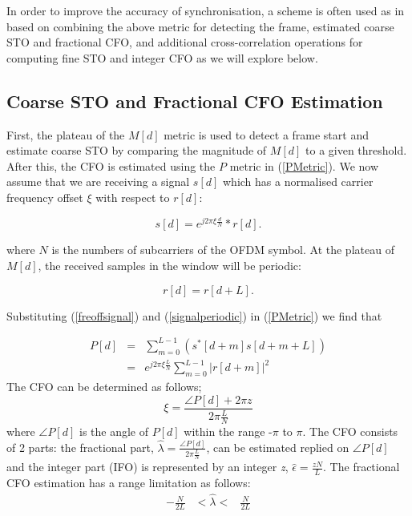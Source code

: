 In order to improve the accuracy of synchronisation, a scheme is often used as in \cite{Schwoerer2002,Manavi2004,Guffey2007,Huang2010,Recio2010} based on combining the above metric for detecting the frame, estimated coarse STO and fractional CFO, and additional cross-correlation operations for computing fine STO and integer CFO as we will explore below. 

\subsection{Coarse STO and Fractional CFO Estimation}

First, the plateau of the $M[d]$ metric is used to detect a frame start and estimate coarse STO by comparing the magnitude of $M[d]$ to a given threshold. After this, the CFO is estimated using the $P$ metric in (\ref{PMetric}). 
We now assume that we are receiving a signal $s[d]$ which has a normalised carrier frequency offset $\xi$ with respect to $r[d]$: 
\begin{center}
\begin{equation}
\label{freoffsignal}
s[d] =  e^{j2\pi\xi \frac{d}{N}}*r[d].
\end{equation}
\end{center} 
where $N$ is the numbers of subcarriers of the OFDM symbol. At the plateau of $M[d]$, the received samples in the window will be periodic:  
\begin{center}
\begin{equation}
\label{signalperiodic}
r[d] =  r[d+L].
\end{equation}
\end{center} 

Substituting (\ref{freoffsignal}) and  (\ref{signalperiodic}) in (\ref{PMetric}) we find that

\begin{eqnarray}
\label{PMetricfreoffset}
P[d] &=& \sum_{m =0}^{L-1}  (s^{*}[d+m] s[d+m+L] ) \nonumber \\
 &=& e^{j2\pi \xi \frac{L}{N}} \sum_{m =0}^{L-1}  |r[d+m]|^2 
\end{eqnarray}
The CFO can be determined as follows;
\begin{equation}
\label{fractionalCFO}
\xi = \frac{\angle P[d] + 2\pi z}{2\pi \frac{L}{N}}
\end{equation}
where  $\angle P[d]$ is the angle of $P[d]$ within the range -$\pi$ to $\pi$. 
The CFO consists of 2 parts: the fractional part, $\hat{\lambda} = \frac{\angle P[d]}{2\pi \frac{L}{N}}$, can be estimated replied on $\angle P[d]$ and the integer part (IFO) is represented by an integer \emph{z}, $\hat{\epsilon} = \frac{z N}{L}$.
The fractional CFO estimation has a range limitation as follows:
\begin{eqnarray}
\label{fractionalCFOlimitation}
 -\frac{N}{2L} & <  \hat{\lambda}   < & \frac{N}{2L}
\end{eqnarray}

